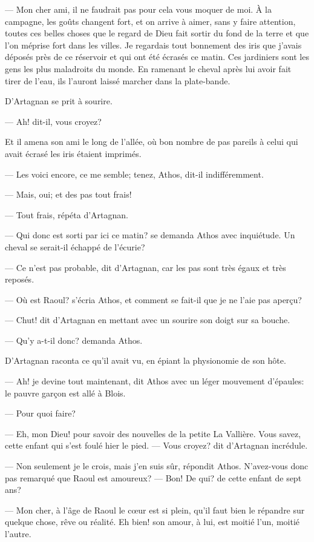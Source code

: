 — Mon cher ami, il ne faudrait pas pour cela vous moquer de moi. À la campagne, les goûts changent fort, et on arrive à aimer, sans y faire attention, toutes ces belles choses que le regard de Dieu fait sortir du fond de la terre et que l'on méprise fort dans les villes. Je regardais tout bonnement des iris que j'avais déposés près de ce réservoir et qui ont été écrasés ce matin. Ces jardiniers sont les gens les plus maladroits du monde. En ramenant le cheval après lui avoir fait tirer de l'eau, ils l'auront laissé marcher dans la plate-bande.

D'Artagnan se prit à sourire.

— Ah! dit-il, vous croyez?

Et il amena son ami le long de l'allée, où bon nombre de pas pareils à celui qui avait écrasé les iris étaient imprimés.

— Les voici encore, ce me semble; tenez, Athos, dit-il indifféremment.

— Mais, oui; et des pas tout frais!

— Tout frais, répéta d'Artagnan.

— Qui donc est sorti par ici ce matin? se demanda Athos avec inquiétude. Un cheval se serait-il échappé de l'écurie?

— Ce n'est pas probable, dit d'Artagnan, car les pas sont très égaux et très reposés.

— Où est Raoul? s'écria Athos, et comment se fait-il que je ne l'aie pas aperçu?

— Chut! dit d'Artagnan en mettant avec un sourire son doigt sur sa bouche.

— Qu'y a-t-il donc? demanda Athos.

D'Artagnan raconta ce qu'il avait vu, en épiant la physionomie de son hôte.

— Ah! je devine tout maintenant, dit Athos avec un léger mouvement d'épaules: le pauvre garçon est allé à Blois.

— Pour quoi faire?

— Eh, mon Dieu! pour savoir des nouvelles de la petite La Vallière. Vous savez, cette enfant qui s'est foulé hier le pied.
— Vous croyez? dit d'Artagnan incrédule.

— Non seulement je le crois, mais j'en suis sûr, répondit Athos. N'avez-vous donc pas remarqué que Raoul est amoureux?
— Bon! De qui? de cette enfant de sept ans?

— Mon cher, à l'âge de Raoul le cœur est si plein, qu'il faut bien le répandre sur quelque chose, rêve ou réalité. Eh bien! son amour, à lui, est moitié l'un, moitié l'autre.

